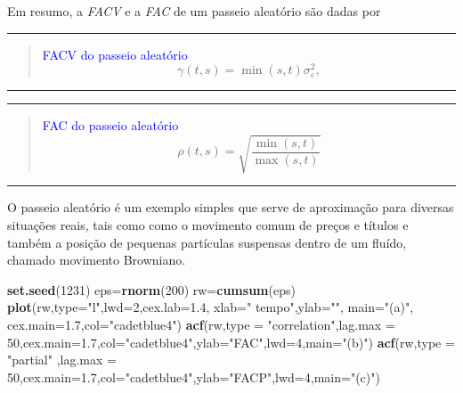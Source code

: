 \documentclass[
]{book}
\newenvironment{Shaded}{\begin{snugshade}}{\end{snugshade}}
\newcommand{\DataTypeTok}[1]{\textcolor[rgb]{0.13,0.29,0.53}{#1}}
\newcommand{\DecValTok}[1]{\textcolor[rgb]{0.00,0.00,0.81}{#1}}
\newcommand{\FloatTok}[1]{\textcolor[rgb]{0.00,0.00,0.81}{#1}}
\newcommand{\KeywordTok}[1]{\textcolor[rgb]{0.13,0.29,0.53}{\textbf{#1}}}
\newcommand{\NormalTok}[1]{#1}
\newcommand{\StringTok}[1]{\textcolor[rgb]{0.31,0.60,0.02}{#1}}
\theoremstyle{definition}
\theoremstyle{definition}
\theoremstyle{definition}
\theoremstyle{remark}
\begin{document}
Em resumo, a \emph{FACV} e a \emph{FAC} de um passeio aleatório são dadas por

\begin{center}\rule{0.5\linewidth}{0.5pt}\end{center}

\begin{quote}
\textcolor{blue}{ FACV do passeio aleatório}
\[
\gamma(t,s) = \min(s,t)\sigma_\varepsilon^2,
\]
\end{quote}

\begin{center}\rule{0.5\linewidth}{0.5pt}\end{center}

\begin{center}\rule{0.5\linewidth}{0.5pt}\end{center}

\begin{quote}
\textcolor{blue}{ FAC do passeio aleatório}\\
\[
\rho(t,s)=\sqrt{\frac{\min(s,t)}{\max(s,t)}}
\]
\end{quote}

\begin{center}\rule{0.5\linewidth}{0.5pt}\end{center}

O passeio aleatório é um exemplo simples que serve de aproximação para diversas situações reais, tais como como o movimento comum de preços e títulos e também a posição de pequenas partículas suspensas dentro de um fluído, chamado movimento Browniano.

\begin{Shaded}
\begin{Highlighting}[]
\KeywordTok{set.seed}\NormalTok{(}\DecValTok{1231}\NormalTok{)}
\NormalTok{eps=}\KeywordTok{rnorm}\NormalTok{(}\DecValTok{200}\NormalTok{)}
\NormalTok{rw=}\KeywordTok{cumsum}\NormalTok{(eps)}
\KeywordTok{plot}\NormalTok{(rw,}\DataTypeTok{type=}\StringTok{"l"}\NormalTok{,}\DataTypeTok{lwd=}\DecValTok{2}\NormalTok{,}\DataTypeTok{cex.lab=}\FloatTok{1.4}\NormalTok{, }\DataTypeTok{xlab=}\StringTok{" tempo"}\NormalTok{,}\DataTypeTok{ylab=}\StringTok{""}\NormalTok{, }\DataTypeTok{main=}\StringTok{"(a)"}\NormalTok{, }\DataTypeTok{cex.main=}\FloatTok{1.7}\NormalTok{,}\DataTypeTok{col=}\StringTok{"cadetblue4"}\NormalTok{)}
\KeywordTok{acf}\NormalTok{(rw,}\DataTypeTok{type =} \StringTok{"correlation"}\NormalTok{,}\DataTypeTok{lag.max =} \DecValTok{50}\NormalTok{,}\DataTypeTok{cex.main=}\FloatTok{1.7}\NormalTok{,}\DataTypeTok{col=}\StringTok{"cadetblue4"}\NormalTok{,}\DataTypeTok{ylab=}\StringTok{"FAC"}\NormalTok{,}\DataTypeTok{lwd=}\DecValTok{4}\NormalTok{,}\DataTypeTok{main=}\StringTok{"(b)"}\NormalTok{)}
\KeywordTok{acf}\NormalTok{(rw,}\DataTypeTok{type =} \StringTok{"partial"}\NormalTok{ ,}\DataTypeTok{lag.max =} \DecValTok{50}\NormalTok{,}\DataTypeTok{cex.main=}\FloatTok{1.7}\NormalTok{,}\DataTypeTok{col=}\StringTok{"cadetblue4"}\NormalTok{,}\DataTypeTok{ylab=}\StringTok{"FACP"}\NormalTok{,}\DataTypeTok{lwd=}\DecValTok{4}\NormalTok{,}\DataTypeTok{main=}\StringTok{"(c)"}\NormalTok{)}
\end{Highlighting}
\end{Shaded}
\end{document}
